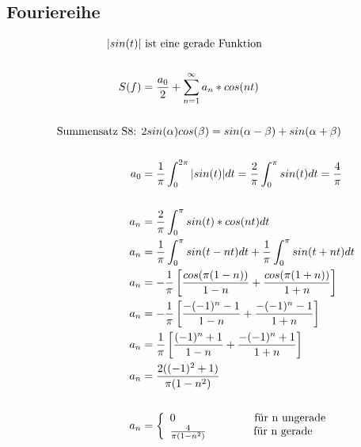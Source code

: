 \subsection{Fouriereihe}
\begin{center}
  \begin{align*}
    |sin(t)| & \text{ ist eine gerade Funktion} \\ \\
    S(f) &= \frac{a_0}{2} + \sum_{n=1}^{\infty} a_n * cos(nt) \\ \\
    \text{Summensatz S8: } & 2sin(\alpha)cos(\beta) = sin(\alpha-\beta)+sin(\alpha+\beta) \\ \\
    a_0 &= \frac{1}{\pi}\int_0^{2\pi} |sin(t)| dt = \frac{2}{\pi}\int_0^{\pi} sin(t) dt = \frac{4}{\pi} \\ \\
    a_n &= \frac{2}{\pi}\int_0^{\pi} sin(t) * cos (nt) dt \\
    a_n &= \frac{1}{\pi}\int_0^{\pi} sin(t - nt) dt +  \frac{1}{\pi}\int_0^{\pi} sin(t + nt) dt\\
    a_n &= -\frac{1}{\pi} \left[ \frac{cos(\pi(1-n))}{1-n} + \frac{cos(\pi(1+n))}{1+n} \right] \\
    a_n &= -\frac{1}{\pi} \left[ \frac{-(-1)^n-1}{1-n} + \frac{-(-1)^n-1}{1+n} \right] \\
    a_n &= \frac{1}{\pi} \left[ \frac{(-1)^n+1}{1-n} + \frac{-(-1)^n+1}{1+n} \right] \\
    a_n &= \frac{2((-1)^2+1)}{\pi(1-n^2)} \\ \\
    a_n &= \left\{\begin{array}{ll}
            0                     \hspace{2.5cm} \text{f\"ur n ungerade}\\
            \frac{4}{\pi(1-n^2)} \hspace{1.5cm} \text{f\"ur n gerade}
            \end{array}\right.
  \end{align*}
\end{center}

